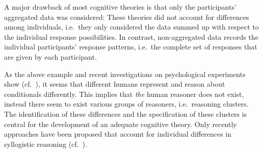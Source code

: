 \documentclass[12pt]{article}
\begin{document}
A major drawback of most cognitive theories is that only the participants'
aggregated data was considered: These theories did not account for differences
among individuals, i.e.\ they only considered the data summed up with respect to the individual response possibilities. In contrast, non-aggregated data records the individual participants' response patterns, i.e.\ the complete set of responses that are given by each participant.


As the above example and recent investigations on psychological experiments show (cf.~\cite{khemlani:2016, ragni:2017}), it seems that different humans represent and reason about conditionals differently.
This implies that \textit{the} human reasoner does not exist, instead there 
seem to exist various groups of reasoners, i.e.\ reasoning clusters. The identification of these differences and the specification of these clusters is central 
for the development of an adequate cognitive theory. Only recently approaches have been proposed that account for individual differences in syllogistic reasoning (cf.~\cite{khemlani:2016,declare:2017}). 


\end{document}
